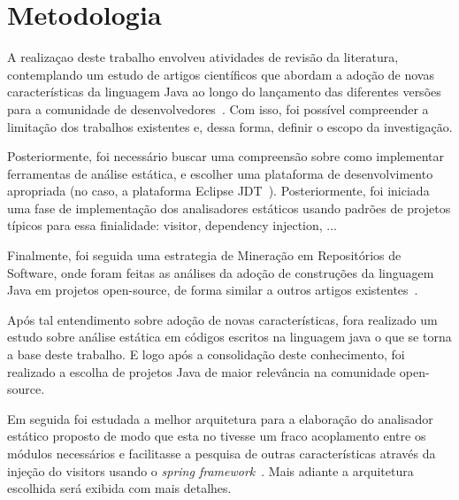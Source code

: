 %


\section{Metodologia}
    
    A realizaçao deste trabalho envolveu atividades de revisão da literatura, contemplando um estudo 
    de artigos científicos que abordam a adoção de novas características da linguagem Java ao longo do 
    lançamento das diferentes versões para a comunidade de desenvolvedores~\cite{Schaefer:ACM2009, Dyer:2013, Parnin:ACM2011, Overbey:2009, Dyer:ACM2014, Bracha:ACM1998, bonifacio:scam2015}. Com isso, foi 
    possível compreender a limitação dos trabalhos existentes e, dessa forma, definir o escopo da 
    investigação. 
    
    Posteriormente, foi necessário buscar uma compreensão sobre como implementar ferramentas de 
    análise estática, e escolher uma plataforma de desenvolvimento apropriada (no caso, a plataforma 
    Eclipse JDT~\cite{EclipseJDT}). Posteriormente, foi iniciada uma fase de implementação dos analisadores 
    estáticos usando padrões de projetos típicos para essa finialidade: visitor, dependency injection, ...
    
     Finalmente, foi seguida uma estrategia de Mineração em Repositórios de Software, onde foram 
     feitas as análises da adoção de construções da linguagem Java em projetos open-source, de forma 
     similar a outros artigos existentes~\cite{Schaefer:ACM2010,pinto-jss:2015,donovan:2004,dinklage:2004, Schaefer:ACM2009, Schaefer:ACM2010, Overbey:2009, Wichmann95industrialperspective, Ayewah:2008:USA:1439186.1439221, bracha1998gj}. 
     
	
	Após tal entendimento sobre adoção de novas características, fora realizado um estudo sobre análise estática em códigos escritos na linguagem java o que se torna a base deste trabalho. E logo após a consolidação deste conhecimento, foi realizado a escolha de projetos Java de maior relevância na comunidade open-source.
	
	Em seguida foi estudada a melhor arquitetura para a elaboração do analisador estático proposto de modo que esta no tivesse um fraco acoplamento entre os módulos necessários e facilitasse a pesquisa de outras características através da injeção do visitors \cite{Gamma:1995} usando o \textit{spring framework}~\cite{SPRING_REF}. Mais adiante a arquitetura escolhida será exibida com mais detalhes.